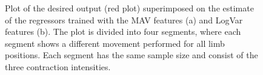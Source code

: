 \begin{figure}[H]
	\centering
	\caption{Plot of the desired output (red plot) superimposed on the estimate of the regressors trained with the MAV features (a) and LogVar features (b). The plot is divided into four segments, where each segment shows a different movement performed for all limb positions. Each segment has the same sample size and consist of the three contraction intensities.}
	\label{fig:SuperPositionTraining}
\end{figure}

